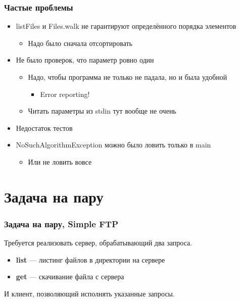 \documentclass[xetex,mathserif,serif]{beamer}
\begin{document}
	\begin{frame}
		\frametitle{Частые проблемы}
		\begin{itemize}
			\item listFiles и Files.walk не гарантируют определённого порядка элементов
			\begin{itemize}
				\item Надо было сначала отсортировать
			\end{itemize}
			\item Не было проверок, что параметр ровно один
			\begin{itemize}
				\item Надо, чтобы программа не только не падала, но и была удобной
				\begin{itemize}
					\item Error reporting!
				\end{itemize}
				\item Читать параметры из stdin тут вообще не очень
			\end{itemize}
			\item Недостаток тестов
			\item NoSuchAlgorithmException можно было ловить только в main 
			\begin{itemize}
				\item Или не ловить вовсе
			\end{itemize}
		\end{itemize}
	\end{frame}

	\section{Задача на пару}

	\begin{frame}
		\frametitle{Задача на пару, Simple FTP}
		Требуется реализовать сервер, обрабатывающий два запроса.
		\begin{itemize}
			\item \textbf{list} --- листинг файлов в директории на сервере
			\item \textbf{get} --- скачивание файла с сервера
		\end{itemize}
		И клиент, позволяющий исполнять указанные запросы.
	\end{frame}
\end{document}
